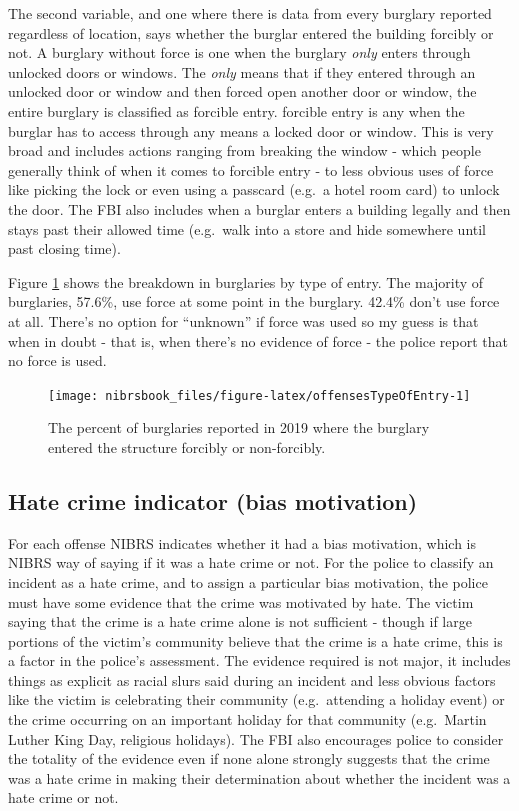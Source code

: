 \documentclass[
  12pt,
  openany]{book}
\begin{document}
The second variable, and one where there is data from every burglary reported regardless of location, says whether the burglar entered the building forcibly or not. A burglary without force is one when the burglary \emph{only} enters through unlocked doors or windows. The \emph{only} means that if they entered through an unlocked door or window and then forced open another door or window, the entire burglary is classified as forcible entry. forcible entry is any when the burglar has to access through any means a locked door or window. This is very broad and includes actions ranging from breaking the window - which people generally think of when it comes to forcible entry - to less obvious uses of force like picking the lock or even using a passcard (e.g.~a hotel room card) to unlock the door. The FBI also includes when a burglar enters a building legally and then stays past their allowed time (e.g.~walk into a store and hide somewhere until past closing time).

Figure \ref{fig:offensesTypeOfEntry} shows the breakdown in burglaries by type of entry. The majority of burglaries, 57.6\%, use force at some point in the burglary. 42.4\% don't use force at all. There's no option for ``unknown'' if force was used so my guess is that when in doubt - that is, when there's no evidence of force - the police report that no force is used.

\begin{figure}

{\centering \texttt{[image: nibrsbook\_files/figure-latex/offensesTypeOfEntry-1]} 

}

\caption{The percent of burglaries reported in 2019 where the burglary entered the structure forcibly or non-forcibly.}\label{fig:offensesTypeOfEntry}
\end{figure}

\hypertarget{hate-crime-indicator-bias-motivation}{%
\subsection{Hate crime indicator (bias motivation)}\label{hate-crime-indicator-bias-motivation}}

For each offense NIBRS indicates whether it had a bias motivation, which is NIBRS way of saying if it was a hate crime or not. For the police to classify an incident as a hate crime, and to assign a particular bias motivation, the police must have some evidence that the crime was motivated by hate. The victim saying that the crime is a hate crime alone is not sufficient - though if large portions of the victim's community believe that the crime is a hate crime, this is a factor in the police's assessment. The evidence required is not major, it includes things as explicit as racial slurs said during an incident and less obvious factors like the victim is celebrating their community (e.g.~attending a holiday event) or the crime occurring on an important holiday for that community (e.g.~Martin Luther King Day, religious holidays). The FBI also encourages police to consider the totality of the evidence even if none alone strongly suggests that the crime was a hate crime in making their determination about whether the incident was a hate crime or not.
\end{document}
